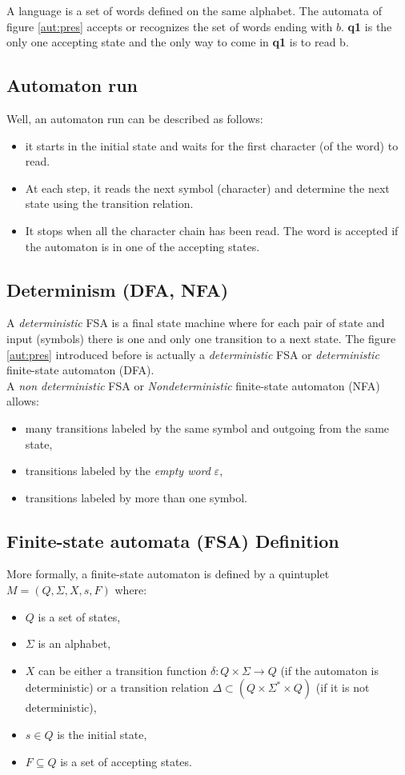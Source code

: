 \noindent A language is a set of words defined on the same alphabet. The automata of figure \ref{aut:pres}
accepts or recognizes the set of words ending with $b$. \textbf{q1} is the only one accepting state and
the only way to come in \textbf{q1} is to read b.

\subsection{Automaton run}
Well, an automaton run can be described as follows:
\begin{itemize}
 \item it starts in the initial state and waits for the first character (of the word) to read.
 \item At each step, it reads the next symbol (character) and determine the next state using the
       transition relation.
 \item It stops when all the character chain has been read. The word is accepted if the automaton is
       in one of the accepting states.
\end{itemize}

\subsection{Determinism (DFA, NFA)}
A \textit{deterministic} FSA is a final state machine where for each pair of state and input (symbols)
there is one and only one transition to a next state. The figure \ref{aut:pres} introduced before is
actually a \textit{deterministic} FSA or \textit{deterministic} finite-state automaton (DFA).\\

\noindent A \textit{non deterministic} FSA or \textit{Nondeterministic} finite-state automaton (NFA) allows:
\begin{itemize}
 \item many transitions labeled by the same symbol and outgoing from the same state,
 \item transitions labeled by the \textit{empty word} $\varepsilon$,
 \item transitions labeled by more than one symbol.
\end{itemize}

\subsection{Finite-state automata (FSA) Definition}
More formally, a finite-state automaton is defined by a quintuplet $M=(Q, \Sigma, X, s, F)$ where:
\begin{itemize}
 \item $Q$ is a set of states,
 \item $\Sigma$ is an alphabet,
 \item $X$ can be either a transition function $\delta : Q \times \Sigma \rightarrow Q$ (if the automaton is
       deterministic) or a transition relation $\Delta \subset (Q \times \Sigma^* \times Q)$ (if it is not
       deterministic),
 \item $s \in Q$ is the initial state,
 \item $F \subseteq Q$ is a set of accepting states.
\end{itemize}

